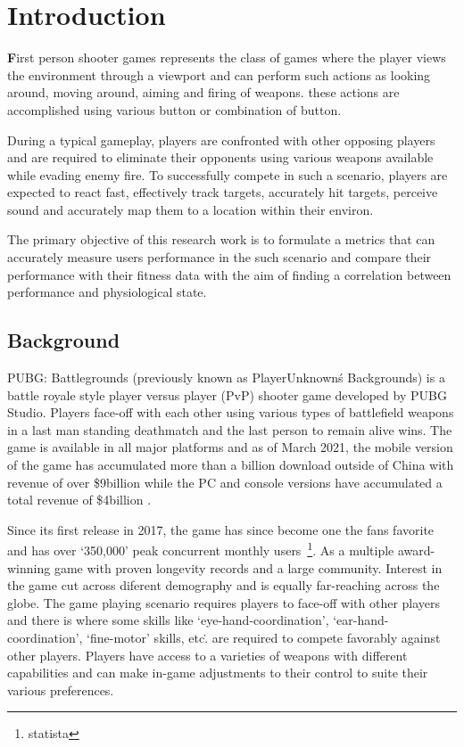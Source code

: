 \chapter{Introduction}

\textbf{F}irst person shooter games represents the class of games where the  player views the environment through a viewport
    and can perform such actions as looking around, moving around, aiming and firing of weapons. these actions are accomplished
    using various button or combination of button.

    During a typical gameplay, players are confronted with other opposing players and are required to eliminate their opponents 
    using various weapons available while evading enemy fire. To successfully compete in such a scenario, players are expected to 
    react fast, effectively track targets, accurately hit targets, perceive sound and accurately map them to a location within 
    their environ.
    
    The primary objective of this research work is to formulate a metrics that can accurately measure users performance in the 
    such scenario and compare their performance with their fitness data with the aim of finding a correlation between 
    performance and physiological state.
    
    \section{Background}
    PUBG: Battlegrounds (previously known as PlayerUnknown\'s Backgrounds) is a battle royale style player versus
    player (PvP) shooter game developed by PUBG Studio. Players face-off with each other using various types of battlefield weapons
    in a last man standing deathmatch and the last person to remain alive wins. The game is available in all major platforms
    and as of March 2021, the mobile version of the game has accumulated more than a billion download outside of China with 
    revenue of over \$9billion while the PC and console versions have accumulated a total revenue of \$4billion
    \cite{statista}.
    \par 
    Since its first release in 2017, the game has since become one the fans favorite and has over `350,000' peak concurrent 
    monthly users~\footnote{statista}. As a multiple award-winning game with proven longevity records and a large community.
    Interest in the game cut across diferent demography and is equally far-reaching across the globe. 
    The game playing scenario requires players to face-off with other players and there is where some skills like 
    `eye-hand-coordination', `ear-hand-coordination', `fine-motor' skills, etc\.. are required to compete favorably against 
    other players. Players have access to a varieties of weapons with different capabilities and can make in-game adjustments
    to their control to suite their various preferences.

